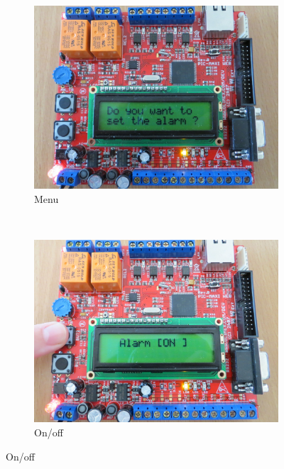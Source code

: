 \documentclass[12pt,a4paper]{article}
\begin{document}
\begin{figure}[!h]
        \centering
        \begin{subfigure}[b]{0.4\textwidth}
                \includegraphics[width=\textwidth]{photos/IMG_2151.JPG}
                \caption{Menu}
                \label{fig:questionalarme}
        \end{subfigure}%
        ~ %
          \begin{subfigure}[b]{0.4\textwidth}
                \includegraphics[width=\textwidth]{photos/IMG_2156.JPG}
                \caption{On/off}
                \label{fig:activeralarme}

\end{subfigure}
\end{figure}
\end{document}
